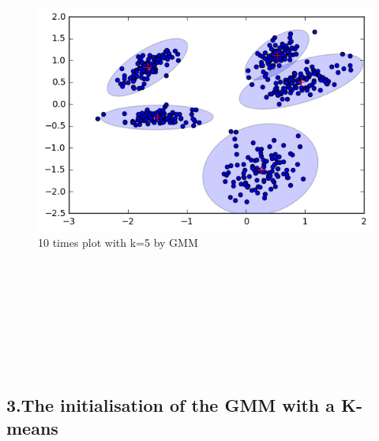 \documentclass[a4paper,11pt]{article}
\begin{document}
\begin{figure}[htbp]
  \includegraphics[scale=0.17]{em10.png}
  \caption{10 times plot with k=5 by GMM}
\end{figure}

\begin{verbatim}








\end{verbatim}

\subsection*{3.The initialisation of the GMM with a K-means}
\end{document}
